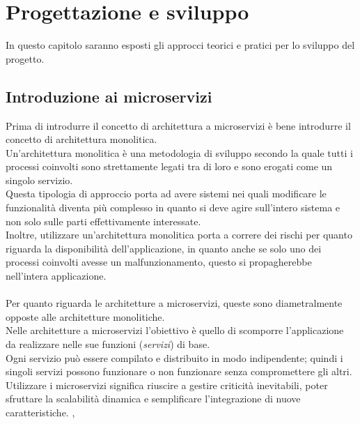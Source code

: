 \chapter{Progettazione e sviluppo}\label{chapter:progettazionesviluppo}
In questo capitolo saranno esposti gli approcci teorici e pratici per lo sviluppo del progetto.


\section{Introduzione ai microservizi}\label{sec:microserviziintro}
Prima di introdurre il concetto di architettura a microservizi è bene introdurre il concetto di architettura monolitica.\\
Un'architettura monolitica è una metodologia di sviluppo secondo la quale tutti i processi coinvolti sono strettamente legati tra di loro e sono erogati 
come un singolo servizio.\\
Questa tipologia di approccio porta ad avere sistemi nei quali modificare le funzionalità diventa più complesso in quanto si deve agire sull'intero sistema e non 
solo sulle parti effettivamente interessate.\\
Inoltre, utilizzare un'architettura monolitica porta a correre dei rischi per quanto riguarda la disponibilità dell'applicazione, in quanto anche se solo uno dei 
processi coinvolti avesse un malfunzionamento, questo si propagherebbe nell'intera applicazione.\\ \\
Per quanto riguarda le architetture a microservizi, queste sono diametralmente opposte alle architetture monolitiche.\\
Nelle architetture a microservizi l'obiettivo è quello di scomporre l'applicazione da realizzare nelle sue funzioni (\emph{servizi}) di base.\\
Ogni servizio può essere compilato e distribuito in modo indipendente; quindi i singoli servizi possono funzionare o non funzionare senza compromettere gli altri.\\
Utilizzare i microservizi significa riuscire a gestire criticità inevitabili, poter sfruttare la scalabilità dinamica e semplificare l'integrazione 
di nuove caratteristiche. \cite{RedHatMicroservices}, \cite{Amazon}\\

